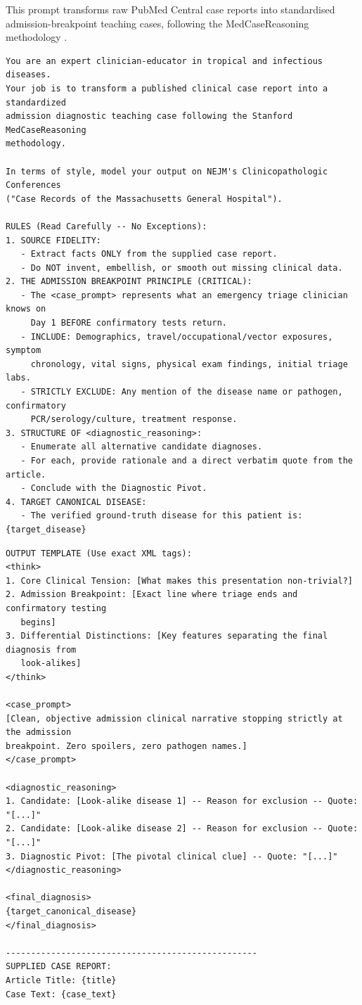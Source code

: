 \documentclass{article}
\begin{document}
This prompt transforms raw PubMed Central case reports into standardised admission-breakpoint teaching cases, following the MedCaseReasoning methodology \cite{wu2025medcasereasoning}.

\begin{promptbox}
\begin{lstlisting}[style=prompt]
You are an expert clinician-educator in tropical and infectious diseases.
Your job is to transform a published clinical case report into a standardized
admission diagnostic teaching case following the Stanford MedCaseReasoning
methodology.

In terms of style, model your output on NEJM's Clinicopathologic Conferences
("Case Records of the Massachusetts General Hospital").

RULES (Read Carefully -- No Exceptions):
1. SOURCE FIDELITY:
   - Extract facts ONLY from the supplied case report.
   - Do NOT invent, embellish, or smooth out missing clinical data.
2. THE ADMISSION BREAKPOINT PRINCIPLE (CRITICAL):
   - The <case_prompt> represents what an emergency triage clinician knows on
     Day 1 BEFORE confirmatory tests return.
   - INCLUDE: Demographics, travel/occupational/vector exposures, symptom
     chronology, vital signs, physical exam findings, initial triage labs.
   - STRICTLY EXCLUDE: Any mention of the disease name or pathogen, confirmatory
     PCR/serology/culture, treatment response.
3. STRUCTURE OF <diagnostic_reasoning>:
   - Enumerate all alternative candidate diagnoses.
   - For each, provide rationale and a direct verbatim quote from the article.
   - Conclude with the Diagnostic Pivot.
4. TARGET CANONICAL DISEASE:
   - The verified ground-truth disease for this patient is: {target_disease}
\end{lstlisting}
\end{promptbox}

\begin{promptbox}
\begin{lstlisting}[style=prompt]
OUTPUT TEMPLATE (Use exact XML tags):
<think>
1. Core Clinical Tension: [What makes this presentation non-trivial?]
2. Admission Breakpoint: [Exact line where triage ends and confirmatory testing
   begins]
3. Differential Distinctions: [Key features separating the final diagnosis from
   look-alikes]
</think>

<case_prompt>
[Clean, objective admission clinical narrative stopping strictly at the admission
breakpoint. Zero spoilers, zero pathogen names.]
</case_prompt>

<diagnostic_reasoning>
1. Candidate: [Look-alike disease 1] -- Reason for exclusion -- Quote: "[...]"
2. Candidate: [Look-alike disease 2] -- Reason for exclusion -- Quote: "[...]"
3. Diagnostic Pivot: [The pivotal clinical clue] -- Quote: "[...]"
</diagnostic_reasoning>

<final_diagnosis>
{target_canonical_disease}
</final_diagnosis>

--------------------------------------------------
SUPPLIED CASE REPORT:
Article Title: {title}
Case Text: {case_text}
\end{lstlisting}
\end{promptbox}
\end{document}
